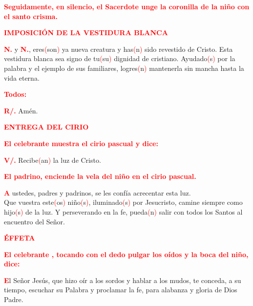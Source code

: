 \documentclass[12pt, letterpaper]{report}
\begin{document}
\large {\bfseries \textcolor{red}{Seguidamente, en silencio, el Sacerdote unge la coronilla de la ni\~no con el santo crisma.}}

\newpage

\Large {\bfseries \textcolor{red}{IMPOSICI\'ON DE LA VESTIDURA BLANCA}} 

\Large {{\bfseries \textcolor{red}{N.}} y {\bfseries \textcolor{red}{N.}}, eres\textcolor{red}{(}son\textcolor{red}{)} ya nueva creatura y has\textcolor{red}{(}n\textcolor{red}{)} sido revestido de Cristo. Esta vestidura blanca sea signo de tu\textcolor{red}{(}su\textcolor{red}{)} dignidad de cristiano. Ayudado\textcolor{red}{(}s\textcolor{red}{)} por la palabra y el ejemplo de sus familiares, logres\textcolor{red}{(}n\textcolor{red}{)} mantenerla sin mancha hasta la vida eterna. }

\large {\bfseries \textcolor{red}{Todos:}} 

\noindent
\Large {\bfseries \textcolor{red}{R/.}} \hspace{0.5cm} Am\'en. 

\Large {\bfseries \textcolor{red}{ENTREGA DEL CIRIO}} 

\large {\bfseries \textcolor{red}{El celebrante muestra el cirio pascual y dice:}} 

\noindent
\Large {\bfseries \textcolor{red}{V/.}} \hspace{0.5cm} Recibe\textcolor{red}{(}an\textcolor{red}{)} la luz de Cristo. 

\large {\bfseries \textcolor{red}{El padrino, enciende la vela del ni\~no en el cirio pascual.}} 

\lettrine[lines=1]{\bfseries \textcolor{red}{A}}{} \Large ustedes, padres y padrinos, se les conf\'ia acrecentar esta luz.\\
Que vuestra este\textcolor{red}{(}os\textcolor{red}{)} ni\~no\textcolor{red}{(}s\textcolor{red}{)}, iluminado\textcolor{red}{(}s\textcolor{red}{)} por Jesucristo, camine siempre como hijo\textcolor{red}{(}s\textcolor{red}{)} de la luz. Y perseverando en la fe, pueda\textcolor{red}{(}n\textcolor{red}{)} salir con todos los Santos al encuentro del Se\~nor. 

\newpage

\Large {\bfseries \textcolor{red}{ \'EFFETA}} 

\large {\bfseries \textcolor{red}{El celebrante , tocando con el dedo pulgar los o\'idos y la boca del ni\~no, dice:}} 

\lettrine[lines=1]{\bfseries \textcolor{red}{E}}{}\Large l Se\~nor Jes\'us, que hizo o\'ir a los sordos y hablar a los mudos, te conceda, a su tiempo, escuchar su Palabra y proclamar la fe, para alabanza y gloria de Dios Padre.
\end{document}
